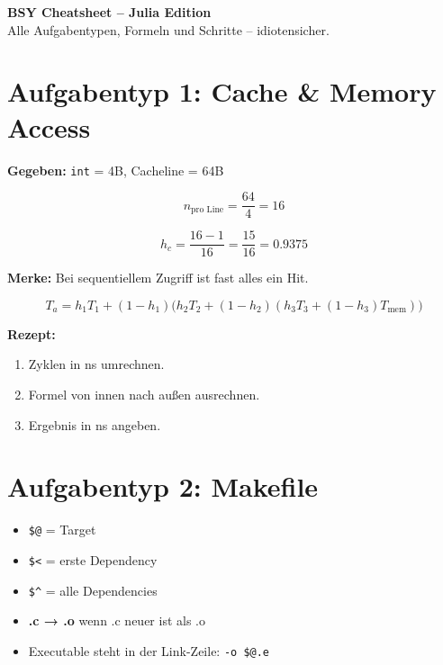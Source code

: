 \documentclass[a4paper,11pt]{article}
\begin{document}
\begin{center}
{\Huge \textbf{BSY Cheatsheet – Julia Edition}}\\[4mm]
{\large \color{bsygray}Alle Aufgabentypen, Formeln und Schritte – idiotensicher.}
\end{center}

\section{Aufgabentyp 1: Cache \& Memory Access}

\begin{tcolorbox}[colback=bsybg,colframe=bsyblue,title=\textbf{Hitrate bei sequentiellem Zugriff}]
\textbf{Gegeben:} \texttt{int} = 4B, Cacheline = 64B

\[
n_{\text{pro Line}} = \frac{64}{4} = 16
\]

\[
h_c = \frac{16-1}{16} = \frac{15}{16} = 0.9375
\]

\textbf{Merke:} Bei sequentiellem Zugriff ist fast alles ein Hit.
\end{tcolorbox}

\begin{tcolorbox}[colback=bsybg,colframe=bsygreen,title=\textbf{AMAT – mittlere Speicherzugriffszeit}]

\[
T_a = h_1 T_1 + (1-h_1)\bigl(h_2 T_2 + (1-h_2)(h_3 T_3 + (1-h_3)T_{\text{mem}})\bigr)
\]

\textbf{Rezept:}
\begin{enumerate}
\item Zyklen in ns umrechnen.
\item Formel von innen nach außen ausrechnen.
\item Ergebnis in ns angeben.
\end{enumerate}
\end{tcolorbox}

\section{Aufgabentyp 2: Makefile}

\begin{tcolorbox}[colback=bsybg,colframe=bsyblue,title=\textbf{Makefile Regeln – Minimalwissen}]
\begin{itemize}
\item \texttt{\$@} = Target
\item \texttt{\$<} = erste Dependency
\item \texttt{\$^} = alle Dependencies
\item \textbf{.c → .o} wenn .c neuer ist als .o
\item Executable steht in der Link-Zeile: \texttt{-o \$@.e}
\end{itemize}
\end{tcolorbox}
\end{document}
